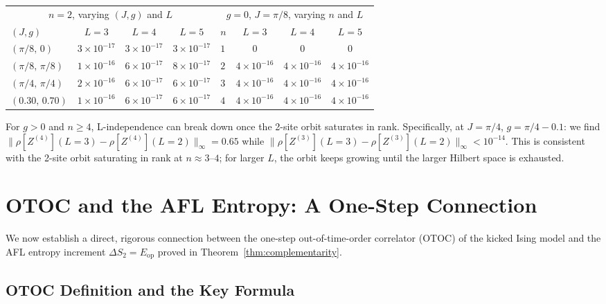 \documentclass[12pt,a4paper]{article}
\begin{document}
\begin{center}
\begin{tabular}{@{}lccc@{\qquad}lccc@{}}
\toprule
\multicolumn{4}{c}{$n=2$, varying $(J,g)$ and $L$} &
\multicolumn{4}{c}{$g=0$, $J=\pi/8$, varying $n$ and $L$}\\
\cmidrule(r){1-4}\cmidrule(l){5-8}
$(J,g)$ & $L=3$ & $L=4$ & $L=5$ &
$n$ & $L=3$ & $L=4$ & $L=5$\\
\midrule
$(\pi/8,\,0)$ & $3\times10^{-17}$ & $3\times10^{-17}$ & $3\times10^{-17}$ &
$1$ & $0$ & $0$ & $0$\\
$(\pi/8,\,\pi/8)$ & $1\times10^{-16}$ & $6\times10^{-17}$ & $8\times10^{-17}$ &
$2$ & $4\times10^{-16}$ & $4\times10^{-16}$ & $4\times10^{-16}$\\
$(\pi/4,\,\pi/4)$ & $2\times10^{-16}$ & $6\times10^{-17}$ & $6\times10^{-17}$ &
$3$ & $4\times10^{-16}$ & $4\times10^{-16}$ & $4\times10^{-16}$\\
$(0.30,\,0.70)$ & $1\times10^{-16}$ & $6\times10^{-17}$ & $6\times10^{-17}$ &
$4$ & $4\times10^{-16}$ & $4\times10^{-16}$ & $4\times10^{-16}$\\
\bottomrule
\end{tabular}
\end{center}

\noindent For $g>0$ and $n\ge 4$, L-independence can break down once the
2-site orbit saturates in rank.  Specifically, at $J=\pi/4$, $g=\pi/4-0.1$: we find
$\|\rho[Z^{(4)}](L=3)-\rho[Z^{(4)}](L=2)\|_\infty = 0.65$ while
$\|\rho[Z^{(3)}](L=3)-\rho[Z^{(3)}](L=2)\|_\infty < 10^{-14}$.
This is consistent with the 2-site orbit saturating in rank at $n\approx 3$--$4$;
for larger $L$, the orbit keeps growing until the larger Hilbert space is exhausted.

\section{OTOC and the AFL Entropy: A One-Step Connection}
\label{sec:otoc_afl}

We now establish a direct, rigorous connection between the one-step
out-of-time-order correlator (OTOC) of the kicked Ising model and the AFL
entropy increment $\Delta S_2 = E_\mathrm{op}$ proved in
Theorem~\ref{thm:complementarity}.

\subsection{OTOC Definition and the Key Formula}
\end{document}
